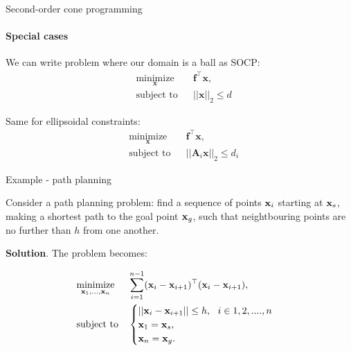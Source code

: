 \documentclass{beamer}
\begin{document}
\begin{frame}{Second-order cone programming}
\framesubtitle{Special cases}
\begin{flushleft}

We can write problem where our domain is a ball as SOCP:
%
\begin{equation}
\begin{aligned}
& \underset{\mathbf{x}}{\text{minimize}}
& & \mathbf{f}^\top\mathbf{x}, \\
& \text{subject to}
& & ||\mathbf{x}||_2 \leq d
\end{aligned}
\end{equation}

\bigskip

Same for ellipsoidal constraints:
%
\begin{equation}
\begin{aligned}
& \underset{\mathbf{x}}{\text{minimize}}
& & \mathbf{f}^\top\mathbf{x}, \\
& \text{subject to}
& & ||\mathbf{A}_i\mathbf{x}||_2 \leq d_i
\end{aligned}
\end{equation}
 
\end{flushleft}
\end{frame}




\begin{frame}{Example - path planning}
	\begin{flushleft}
		
		Consider a path planning problem: find a sequence of points $\mathbf{x}_i$ starting at $\mathbf{x}_s$, making a shortest path to the goal point $\mathbf{x}_g$, such that neightbouring points are no further than $h$ from one another.
		
		\bigskip
		
		\textbf{Solution}. 
		The problem becomes:
		
		
		\begin{equation}
			\begin{aligned}
				& \underset{\mathbf{x}_1, ..., \mathbf{x}_n}{\text{minimize}}
				& & \sum_{i = 1}^{n-1} (\mathbf{x}_i - \mathbf{x}_{i+1})^\top (\mathbf{x}_i - \mathbf{x}_{i+1}), \\
				& \text{subject to}
				& &
				\begin{cases}
					||\mathbf{x}_i - \mathbf{x}_{i+1} || \leq h, \ \ i \in {1, 2, ...., n} \\
					\mathbf{x}_1 = \mathbf{x}_s, \\
					\mathbf{x}_n = \mathbf{x}_g.
				\end{cases}
			\end{aligned}
		\end{equation}
		
	\end{flushleft}
\end{frame}
\end{document}
